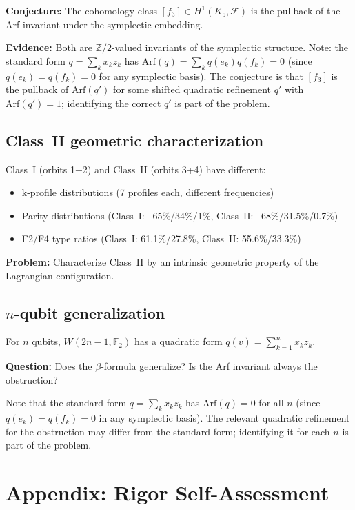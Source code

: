\documentclass[11pt,a4paper]{article}
\theoremstyle{remark}
\newcommand{\Z}{\mathbb{Z}}
\newcommand{\F}{\mathbb{F}}
\newcommand{\cF}{\mathcal{F}}
\begin{document}
\textbf{Conjecture:} The cohomology class $[f_3] \in H^1(K_5, \cF)$ is
the pullback of the Arf invariant under the symplectic embedding.

\textbf{Evidence:} Both are $\Z/2$-valued invariants of the symplectic
structure. Note: the standard form $q = \sum_k x_k z_k$ has
$\mathrm{Arf}(q) = \sum_k q(e_k)q(f_k) = 0$ (since $q(e_k) = q(f_k) = 0$
for any symplectic basis). The conjecture is that $[f_3]$ is the pullback
of $\mathrm{Arf}(q')$ for some shifted quadratic refinement $q'$ with
$\mathrm{Arf}(q') = 1$; identifying the correct $q'$ is part of the problem.

\subsection{Class~II geometric characterization}

Class~I (orbits 1+2) and Class~II (orbits 3+4) have different:
\begin{itemize}
\item k-profile distributions (7 profiles each, different frequencies)
\item Parity distributions (Class~I: ~65\%/34\%/1\%, Class~II:
  ~68\%/31.5\%/0.7\%)
\item F2/F4 type ratios (Class~I: 61.1\%/27.8\%, Class~II:
  55.6\%/33.3\%)
\end{itemize}

\textbf{Problem:} Characterize Class~II by an intrinsic geometric
property of the Lagrangian configuration.

\subsection{\texorpdfstring{$n$-qubit generalization}{n-qubit generalization}}

For $n$ qubits, $W(2n-1, \F_2)$ has a quadratic form
$q(v) = \sum_{k=1}^n x_k z_k$.

\textbf{Question:} Does the $\beta$-formula generalize? Is the Arf
invariant always the obstruction?

Note that the standard form $q = \sum_k x_k z_k$ has $\mathrm{Arf}(q) = 0$
for all $n$ (since $q(e_k) = q(f_k) = 0$ in any symplectic basis). The
relevant quadratic refinement for the obstruction may differ from the
standard form; identifying it for each $n$ is part of the problem.

\appendix
\section*{Appendix: Rigor Self-Assessment}
\label{app:rigor}
\end{document}

